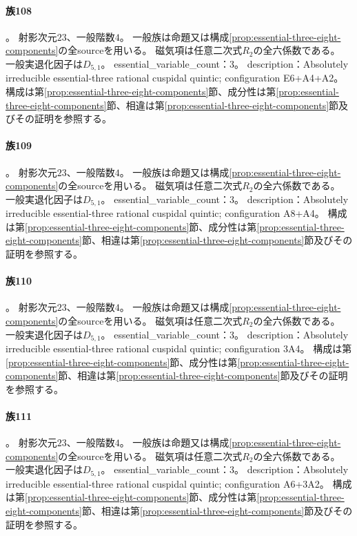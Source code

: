 \paragraph{族108}\label{catalogue:R4_PLANE_QUINTIC_E6_A4_A2_23}
。
射影次元$23$、一般階数$4$。
一般族は命題又は構成\ref{prop:essential-three-eight-components}の全sourceを用いる。
磁気項は任意二次式$R_2$の全六係数である。
一般実退化因子は$D_{5,1}$。
essential\_variable\_count：3。
description：Absolutely irreducible essential-three rational cuspidal quintic; configuration E6+A4+A2。
構成は第\ref{prop:essential-three-eight-components}節、成分性は第\ref{prop:essential-three-eight-components}節、相違は第\ref{prop:essential-three-eight-components}節及びその証明を参照する。

\paragraph{族109}\label{catalogue:R4_PLANE_QUINTIC_A8_A4_23}
。
射影次元$23$、一般階数$4$。
一般族は命題又は構成\ref{prop:essential-three-eight-components}の全sourceを用いる。
磁気項は任意二次式$R_2$の全六係数である。
一般実退化因子は$D_{5,1}$。
essential\_variable\_count：3。
description：Absolutely irreducible essential-three rational cuspidal quintic; configuration A8+A4。
構成は第\ref{prop:essential-three-eight-components}節、成分性は第\ref{prop:essential-three-eight-components}節、相違は第\ref{prop:essential-three-eight-components}節及びその証明を参照する。

\paragraph{族110}\label{catalogue:R4_PLANE_QUINTIC_THREE_A4_23}
。
射影次元$23$、一般階数$4$。
一般族は命題又は構成\ref{prop:essential-three-eight-components}の全sourceを用いる。
磁気項は任意二次式$R_2$の全六係数である。
一般実退化因子は$D_{5,1}$。
essential\_variable\_count：3。
description：Absolutely irreducible essential-three rational cuspidal quintic; configuration 3A4。
構成は第\ref{prop:essential-three-eight-components}節、成分性は第\ref{prop:essential-three-eight-components}節、相違は第\ref{prop:essential-three-eight-components}節及びその証明を参照する。

\paragraph{族111}\label{catalogue:R4_PLANE_QUINTIC_A6_THREE_A2_23}
。
射影次元$23$、一般階数$4$。
一般族は命題又は構成\ref{prop:essential-three-eight-components}の全sourceを用いる。
磁気項は任意二次式$R_2$の全六係数である。
一般実退化因子は$D_{5,1}$。
essential\_variable\_count：3。
description：Absolutely irreducible essential-three rational cuspidal quintic; configuration A6+3A2。
構成は第\ref{prop:essential-three-eight-components}節、成分性は第\ref{prop:essential-three-eight-components}節、相違は第\ref{prop:essential-three-eight-components}節及びその証明を参照する。

